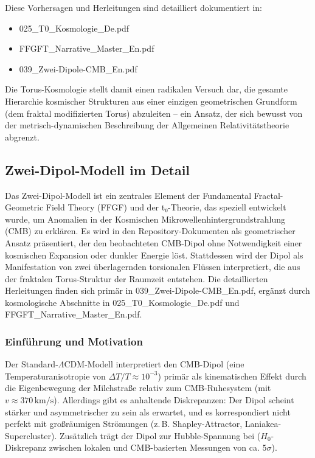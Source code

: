 	Diese Vorhersagen und Herleitungen sind detailliert dokumentiert in:
	\begin{itemize}
		\item 025\_T0\_Kosmologie\_De.pdf
		\item FFGFT\_Narrative\_Master\_En.pdf
		\item 039\_Zwei-Dipole-CMB\_En.pdf
	\end{itemize}
	
	Die Torus-Kosmologie stellt damit einen radikalen Versuch dar, die gesamte Hierarchie kosmischer Strukturen aus einer einzigen geometrischen Grundform (dem fraktal modifizierten Torus) abzuleiten – ein Ansatz, der sich bewusst von der metrisch-dynamischen Beschreibung der Allgemeinen Relativitätstheorie abgrenzt.
	\subsection{Zwei-Dipol-Modell im Detail}
	
	Das Zwei-Dipol-Modell ist ein zentrales Element der Fundamental Fractal-Geometric Field Theory (FFGF) und der t₀-Theorie, das speziell entwickelt wurde, um Anomalien in der Kosmischen Mikrowellenhintergrundstrahlung (CMB) zu erklären. Es wird in den Repository-Dokumenten als geometrischer Ansatz präsentiert, der den beobachteten CMB-Dipol ohne Notwendigkeit einer kosmischen Expansion oder dunkler Energie löst. Stattdessen wird der Dipol als Manifestation von zwei überlagernden torsionalen Flüssen interpretiert, die aus der fraktalen Torus-Struktur der Raumzeit entstehen. Die detaillierten Herleitungen finden sich primär in 039\_Zwei-Dipole-CMB\_En.pdf, ergänzt durch kosmologische Abschnitte in 025\_T0\_Kosmologie\_De.pdf und FFGFT\_Narrative\_Master\_En.pdf.
	
	\subsubsection{Einführung und Motivation}
	
	Der Standard-$\Lambda$CDM-Modell interpretiert den CMB-Dipol (eine Temperaturanisotropie von $\Delta T / T \approx 10^{-3}$) primär als kinematischen Effekt durch die Eigenbewegung der Milchstraße relativ zum CMB-Ruhesystem (mit $v \approx 370\,\text{km/s}$). Allerdings gibt es anhaltende Diskrepanzen: Der Dipol scheint stärker und asymmetrischer zu sein als erwartet, und es korrespondiert nicht perfekt mit großräumigen Strömungen (z.\,B. Shapley-Attractor, Laniakea-Supercluster). Zusätzlich trägt der Dipol zur Hubble-Spannung bei ($H_0$-Diskrepanz zwischen lokalen und CMB-basierten Messungen von ca. $5\sigma$).
	
